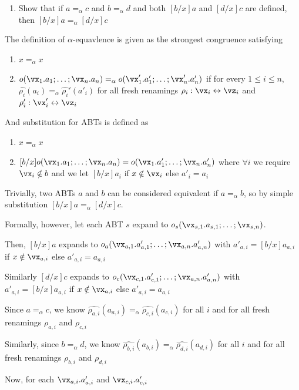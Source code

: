 \documentclass[11pt]{book}
\begin{document}
\begin{enumerate}
    \item[1.3] Show that if $a =_\alpha c$ and $b =_\alpha d$ and both $[b/x]a$ and $[d/x]c$ are defined, then $[b/x]a =_\alpha [d/x]c$
\end{enumerate}

The definition of $\alpha$-equavlence is given as the strongest congruence satisfying
\begin{enumerate}
    \item $x =_\alpha x$
    \item $o(\vx_1.a_1;\dots;\vx_n.a_n) =_\alpha o(\vx'_1.a'_1;\dots;\vx'_n.a'_n)$ if for every $1 \leq i \leq n$, $\hat{\rho_i}(a_i)=_\alpha \hat{\rho_i}'(a'_i)$ for all fresh renamings $\rho_i: \vx_i \leftrightarrow \vz_i$ and $\rho'_i: \vx'_i \leftrightarrow \vz_i$
\end{enumerate}

And substitution for ABTs is defined as
\begin{enumerate}
    \item $x =_\alpha x$
    \item $[b/x]o(\vx_1.a_1;\dots;\vx_n.a_n) = o(\vx_1.a'_1;\dots;\vx_n.a'_n)$ where $\forall i$ we require $\vx_i \notin b$ and we let $[b/x]a_i$ if $x \notin \vx_i$ else $a'_i = a_i$ 
\end{enumerate}

Trivially, two ABTs $a$ and $b$ can be considered equivalent if $a =_\alpha b$, so by simple substitution $[b/x]a =_\alpha [d/x]c$.

\br

Formally, however, let each ABT $s$ expand to $o_s(\vx_{s,1}.a_{s,1};\dots;\vx_{s,n})$. 

Then, $[b/x]a$ expands to $o_a(\vx_{a,1}.a'_{a,1};\dots;\vx_{a,n}.a'_{a,n})$ with $a'_{a,i} = [b/x]a_{a,i}$ if $x \notin \vx_{a,i}$ else $a'_{a,i} = a_{a,i}$

Similarly $[d/x]c$ expands to $o_c(\vx_{c,1}.a'_{c,1};\dots;\vx_{a,n}.a'_{a,n})$ with $a'_{a,i} = [b/x]a_{a,i}$ if $x \notin \vx_{a,i}$ else $a'_{a,i} = a_{a,i}$

\br

Since $a =_\alpha c$, we know $\hat{\rho_{a,i}}(a_{a,i}) =_\alpha \hat{\rho_{c,i}}(a_{c,i})$ for all $i$ and for all fresh renamings $\rho_{a,i}$ and $\rho_{c,i}$

Similarly, since $b =_\alpha d$, we know $\hat{\rho_{b,i}}(a_{b,i}) =_\alpha \hat{\rho_{d,i}}(a_{d,i})$ for all $i$ and for all fresh renamings $\rho_{b,i}$ and $\rho_{d,i}$

Now, for each $\vx_{a,i}.a'_{a,i}$ and $\vx_{c,i}.a'_{c,i}$
\end{document}
